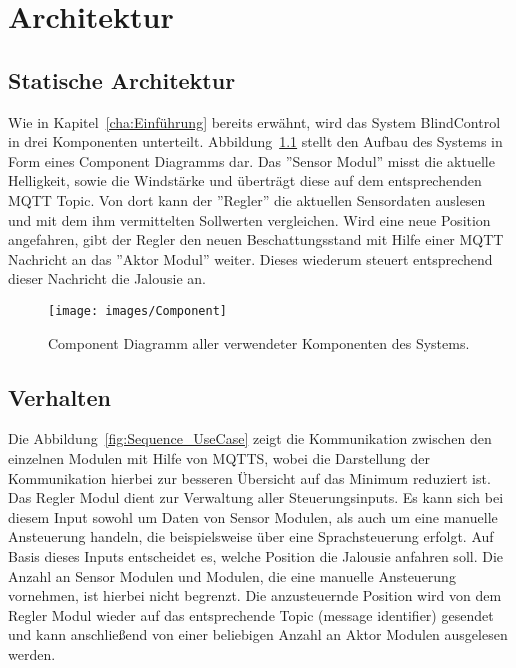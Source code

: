 \chapter{Architektur}
\label{cha:Architektur}

\section{Statische Architektur}
Wie in Kapitel~\ref{cha:Einführung} bereits erwähnt, wird das System BlindControl in drei Komponenten unterteilt. Abbildung~\ref{fig:component_diagramm} stellt den Aufbau des Systems in Form eines Component Diagramms dar. Das ''Sensor Modul'' misst die aktuelle Helligkeit, sowie die Windstärke und überträgt diese auf dem entsprechenden MQTT Topic. Von dort kann der ''Regler'' die aktuellen Sensordaten auslesen und mit dem ihm vermittelten Sollwerten vergleichen. Wird eine neue Position angefahren, gibt der Regler den neuen Beschattungsstand mit Hilfe einer MQTT Nachricht an das ''Aktor Modul'' weiter. Dieses wiederum steuert entsprechend dieser Nachricht die Jalousie an.
\begin{figure}[hbt]
	\centering
	\texttt{[image: images/Component]}
	\caption[Component Diagramm]{Component Diagramm aller verwendeter Komponenten des Systems.}
	\label{fig:component_diagramm}
\end{figure}

\section{Verhalten}
Die Abbildung~\ref{fig:Sequence_UseCase} zeigt die Kommunikation zwischen den einzelnen Modulen mit Hilfe von MQTTS, wobei die Darstellung der Kommunikation hierbei zur besseren Übersicht auf das Minimum reduziert ist. Das Regler Modul dient zur Verwaltung aller Steuerungsinputs. Es kann sich bei diesem Input sowohl um Daten von Sensor Modulen, als auch um eine manuelle Ansteuerung handeln, die beispielsweise über eine Sprachsteuerung erfolgt. Auf Basis dieses Inputs entscheidet es, welche Position die Jalousie anfahren soll. Die Anzahl an Sensor Modulen und Modulen, die eine manuelle Ansteuerung vornehmen, ist hierbei nicht begrenzt. Die anzusteuernde Position wird von dem Regler Modul wieder auf das entsprechende Topic (message identifier) gesendet und kann anschließend von einer beliebigen Anzahl an Aktor Modulen ausgelesen werden.

